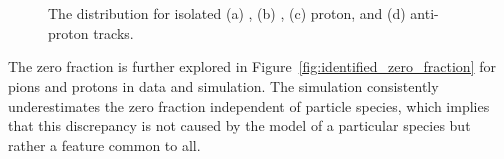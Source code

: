 \begin{figure}[h]
\centering
{}
~
\\
~
\caption{The \ep distribution for isolated (a) \pip, (b) \pim, (c) proton, and (d) anti-proton tracks.}
\label{fig:identified_eoverp}
\end{figure}

The zero fraction is further explored in Figure~\ref{fig:identified_zero_fraction} for pions and protons in data and simulation. 
The simulation consistently underestimates the zero fraction independent of particle species, which implies that this discrepancy is not caused by the model of a particular species but rather a feature common to all.

